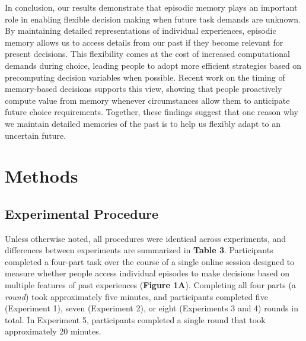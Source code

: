 \documentclass[10pt,letterpaper]{article}
\begin{document}
In conclusion, our results demonstrate that episodic memory plays an important role in enabling flexible decision making when future task demands are unknown. By maintaining detailed representations of individual experiences, episodic memory allows us to access details from our past if they become relevant for present decisions. This flexibility comes at the cost of increased computational demands during choice, leading people to adopt more efficient strategies based on precomputing decision variables when possible. Recent work on the timing of memory-based decisions supports this view, showing that people proactively compute value from memory whenever circumstances allow them to anticipate future choice requirements\cite{nicholasProactiveReactiveConstruction2025}. Together, these findings suggest that one reason why we maintain detailed memories of the past is to help us flexibly adapt to an uncertain future.

\section{Methods}

\subsection{Experimental Procedure}

Unless otherwise noted, all procedures were identical across experiments, and differences between experiments are summarized in \textbf{Table 3}. Participants completed a four-part task over the course of a single online session designed to measure whether people access individual episodes to make decisions based on multiple features of past experiences (\textbf{Figure 1A}). Completing all four parts (a \textit{round}) took approximately five minutes, and participants completed five (Experiment 1), seven (Experiment 2), or eight (Experiments 3 and 4) rounds in total. In Experiment 5, participants completed a single round that took approximately 20 minutes.
\end{document}
